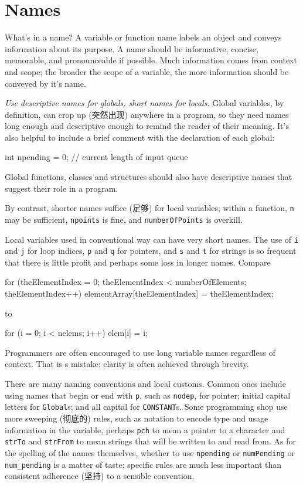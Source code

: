\section{Names}
\label{sec:names}
What's in a name? A variable or function name labels an object and conveys
information about its purpose. A name should be informative, concise,
memorable, and pronounceable if possible. Much information comes from
context and scope; the broader the scope of a variable, the more
information should be conveyed by it's name.

\emph{Use descriptive names for globals, short names for locals.} Global
variables, by definition, can crop up (突然出现) anywhere in a program, so
they need names long enough and descriptive enough to remind the reader of
their meaning. It's also helpful to include a brief comment with the
declaration of each global:
\begin{wellcode}
    int npending = 0;   // current length of input queue
\end{wellcode}
Global functions, classes and structures should also have descriptive names
that suggest their role in a program.

By contrast, shorter names suffice (足够) for local variables; within a
function, \verb"n" may be sufficient, \verb"npoints" is fine, and
\verb"numberOfPoints" is overkill.

Local variables used in conventional way can have very short names. The use
of \verb"i" and \verb"j" for loop indices, \verb"p" and \verb"q" for
pointers, and \verb"s" and \verb"t" for strings is so frequent that there
is little profit and perhaps some loss in longer names. Compare
\begin{badcode}
    for (theElementIndex = 0; theElementIndex < numberOfElements;
            theElementIndex++)
        elementArray[theElementIndex] = theElementIndex;
\end{badcode}
to 
\begin{wellcode}
    for (i = 0; i < nelems; i++)
        elem[i] = i;
\end{wellcode}
Programmers are often encouraged to use long variable names regardless of
context. That is s mistake: clarity is often achieved through brevity.

There are many naming conventions and local customs. Common ones include
using names that begin or end with \verb"p", such as \verb"nodep", for
pointer; initial capital letters for \verb"Global"s; and all capital for
\verb"CONSTANT"s. Some programming shop use more sweeping (彻底的) rules,
such as notation to encode type and usage information in the variable,
perhaps \verb"pch" to mean a pointer to a character and \verb"strTo" and
\verb"strFrom" to mean strings that will be written to and read from. As
for the spelling of the names themselves, whether to use \verb"npending" or
\verb"numPending" or \verb"num_pending" is a matter of taste; specific
rules are much less important than consistent adherence (坚持) to a sensible
convention.


